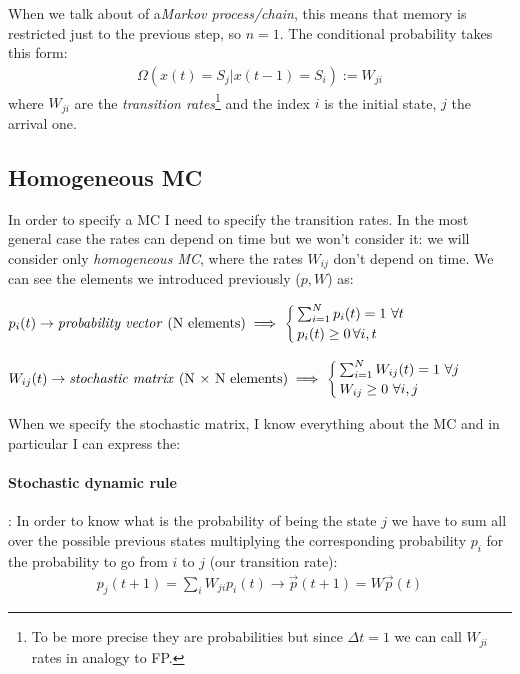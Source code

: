 \documentclass[\main/main.tex]{subfiles}
\begin{document}
When we talk about of a\textit{Markov process/chain}, this means that memory is restricted just to the previous step, so $n=1$. The conditional probability takes this form:
\begin{eqnarray}
    \Omega(x(t)=S_j|x(t-1)=S_i) := W_{ji}
\end{eqnarray}
where $W_{ji}$ are the \textit{transition rates}\footnote{To be more precise they are probabilities but since $\Delta t = 1 $ we can call $W_{ji}$ rates in analogy to FP.} and the index $i$ is the initial state, $j$ the arrival one.

\subsection{Homogeneous MC}
In order to specify a MC I need to specify the transition rates. In the most general case the rates can depend on time but we won't consider it: we will consider only \textit{homogeneous MC}, where the rates $W_{ij}$ don't depend on time. We can see the elements we introduced previously ($p,W$) as:
\par\medskip

$p_i(t)\to \text{\textit{probability vector} (N elements)} \implies
\begin{cases}
\sum_{i=1} ^N p_i(t)=1 \,\,\forall t \\
p_i (t) \geq 0 \,\forall i,t
\end{cases}$

$W_{ij}(t)\to \text{\textit{stochastic matrix }(N $\times$ N elements)} \implies
\begin{cases}
\sum_{i=1} ^N W_{ij}(t)=1 \,\,\forall j \\
W_{ij} \geq 0 \,\,\forall i,j
\end{cases}$

\par\bigskip

When we specify the stochastic matrix, I know everything about the MC and in particular I can express the:

\paragraph{Stochastic dynamic rule}:
In order to know what is the probability of being the state $j$ we have to sum all over the possible previous states multiplying the corresponding probability $p_i$ for the probability to go from $i$ to $j$ (our transition rate):
\begin{eqnarray}
    p_j(t+1)=\sum_i W_{ji} p_i(t) \to \Vec{p}(t+1)=W\Vec{p}(t)
    \label{eq:MC}
\end{eqnarray}
\end{document}
